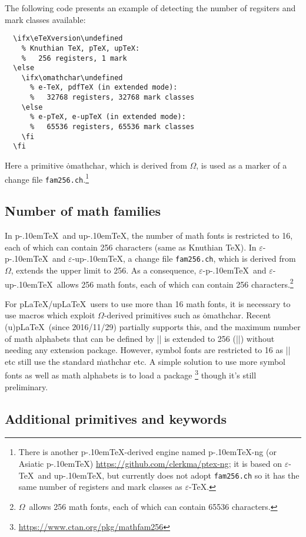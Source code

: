 \documentclass[a4paper,11pt,dvipdfmx]{article}
\def\code#1{\texttt{#1}}
\def\eTeXpre{$\varepsilon$-}
\def\eTeX{\leavevmode\hbox{\eTeXpre\TeX}}
\def\epTeX{\leavevmode\hbox{\eTeXpre\pTeX}}
\def\eupTeX{\leavevmode\hbox{\eTeXpre\upTeX}}
\def\pTeX{p\kern-.10em\TeX}\def\upTeX{u\pTeX}
\def\pLaTeX{p\LaTeX}\def\upLaTeX{u\pLaTeX}
\def\OMEGA{$\Omega$}
\begin{document}
The following code presents an example of detecting the number of
regsiters and mark classes available:
\begin{verbatim}
  \ifx\eTeXversion\undefined
    % Knuthian TeX, pTeX, upTeX:
    %   256 registers, 1 mark
  \else
    \ifx\omathchar\undefined
      % e-TeX, pdfTeX (in extended mode):
      %   32768 registers, 32768 mark classes
    \else
      % e-pTeX, e-upTeX (in extended mode):
      %   65536 registers, 65536 mark classes
    \fi
  \fi
\end{verbatim}
Here a primitive \.{omathchar}, which is derived from \OMEGA, is used
as a marker of a change file \code{fam256.ch}.\footnote{%
There is another \pTeX-derived engine named \pTeX-ng (or Asiatic \pTeX)
\url{https://github.com/clerkma/ptex-ng}; it is based on
\eTeX\ and \upTeX, but currently does not adopt \code{fam256.ch}
so it has the same number of registers and mark classes as \eTeX.}

\subsection{Number of math families}

In \pTeX\ and \upTeX,
the number of math fonts is restricted to 16,
each of which can contain 256 characters (same as Knuthian \TeX).
In \epTeX\ and \eupTeX, a change file \code{fam256.ch},
which is derived from \OMEGA, extends the upper limit to 256.
As a consequence, \epTeX\ and \eupTeX\ allows 256 math fonts,
each of which can contain 256 characters.\footnote{\OMEGA\ allows
256 math fonts, each of which can contain 65536 characters.}

For \pLaTeX/\upLaTeX\ users to use more than 16 math fonts,
it is necessary to use macros which exploit \OMEGA-derived primitives
such as \.{omathchar}.
Recent (u)\pLaTeX\ (since 2016/11/29) partially supports this,
and the maximum number of math alphabets that can be defined by
|\DeclareMathAlphabet| is extended to 256 (|\e@mathgroup@top|)
without needing any extension package.
However, symbol fonts are restricted to 16 as
|\DeclareMathSymbol| etc still use the standard \.{mathchar} etc.
A simple solution to use more symbol fonts as well as math alphabets
is to load a package \footnote{%
\url{https://www.ctan.org/pkg/mathfam256}} though it's still preliminary.

\subsection{Additional primitives and keywords}
\end{document}

